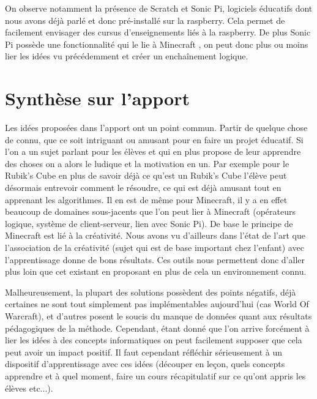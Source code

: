 On observe notamment la présence de Scratch et Sonic Pi, logiciels éducatifs dont nous avons déjà parlé et donc pré-installé sur la raspberry. Cela permet de facilement envisager des cursus d'enseignements liés à la raspberry. De plus Sonic Pi possède une fonctionnalité qui le lie à Minecraft \cite{68}, on peut donc plus ou moins lier les idées vu précédemment et créer un enchaînement logique.

\newpage

\section{Synthèse sur l'apport}

Les idées proposées dans l'apport ont un point commun. Partir de quelque chose de connu, que ce soit intriguant ou amusant pour en faire un projet éducatif. Si l'on a un sujet parlant pour les élèves et qui en plus propose de leur apprendre des choses on a alors le ludique et la motivation en un. Par exemple pour le Rubik's Cube en plus de savoir déjà ce qu'est un Rubik's Cube l'élève peut désormais entrevoir comment le résoudre, ce qui est déjà amusant tout en apprenant les algorithmes. Il en est de même pour Minecraft, il y a en effet beaucoup de domaines sous-jacents que l'on peut lier à Minecraft (opérateurs logique, système de client-serveur, lien avec Sonic Pi). De base le principe de Minecraft est lié à la créativité. Nous avons vu d'ailleurs dans l'état de l'art que l'association de la créativité (sujet qui est de base important chez l'enfant) avec l'apprentissage donne de bons résultats. Ces outils nous permettent donc d'aller plus loin que cet existant en proposant en plus de cela un environnement connu.

Malheureusement, la plupart des solutions possèdent des points négatifs, déjà certaines ne sont tout simplement pas implémentables aujourd'hui (cas World Of Warcraft), et d'autres posent le soucis du manque de données quant aux résultats pédagogiques de la méthode. Cependant, étant donné que l'on arrive forcément à lier les idées à des concepts informatiques on peut facilement supposer que cela peut avoir un impact positif. Il faut cependant réfléchir sérieusement à un dispositif d'apprentissage avec ces idées (découper en leçon, quels concepts apprendre et à quel moment, faire un cours récapitulatif sur ce qu'ont appris les élèves etc...).

\newpage
